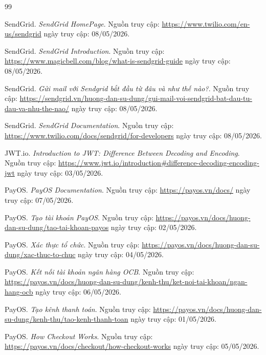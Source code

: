 \begin{thebibliography}{99}

SendGrid. \textit{SendGrid HomePage}. 
Nguồn truy cập: \url{https://www.twilio.com/en-us/sendgrid} ngày truy cập: 08/05/2026.

SendGrid. \textit{SendGrid Introduction}. 
Nguồn truy cập: \url{https://www.magicbell.com/blog/what-is-sendgrid-guide} ngày truy cập: 08/05/2026.

SendGrid. \textit{Gửi mail với Sendgrid bắt đầu từ đâu và như thế nào?}. 
Nguồn truy cập: \url{https://sendgrid.vn/huong-dan-su-dung/gui-mail-voi-sendgrid-bat-dau-tu-dau-va-nhu-the-nao/} ngày truy cập: 08/05/2026.

SendGrid. \textit{SendGrid Documentation}. 
Nguồn truy cập: \url{https://www.twilio.com/docs/sendgrid/for-developers} ngày truy cập: 08/05/2026.

JWT.io. \textit{Introduction to JWT: Difference Between Decoding and Encoding}. 
Nguồn truy cập: \url{https://www.jwt.io/introduction#difference-decoding-encoding-jwt} ngày truy cập: 03/05/2026.

PayOS. \textit{PayOS Documentation}. 
Nguồn truy cập: \url{https://payos.vn/docs/} ngày truy cập: 07/05/2026.

PayOS. \textit{Tạo tài khoản PayOS}. 
Nguồn truy cập: \url{https://payos.vn/docs/huong-dan-su-dung/tao-tai-khoan-payos} ngày truy cập: 02/05/2026.

PayOS. \textit{Xác thực tổ chức}. 
Nguồn truy cập: \url{https://payos.vn/docs/huong-dan-su-dung/xac-thuc-to-chuc} ngày truy cập: 04/05/2026.

PayOS. \textit{Kết nối tài khoản ngân hàng OCB}. 
Nguồn truy cập: \url{https://payos.vn/docs/huong-dan-su-dung/kenh-thu/ket-noi-tai-khoan/ngan-hang-ocb} ngày truy cập: 06/05/2026.

PayOS. \textit{Tạo kênh thanh toán}. 
Nguồn truy cập: \url{https://payos.vn/docs/huong-dan-su-dung/kenh-thu/tao-kenh-thanh-toan} ngày truy cập: 01/05/2026.

PayOS. \textit{How Checkout Works}. 
Nguồn truy cập: \url{https://payos.vn/docs/checkout/how-checkout-works} ngày truy cập: 05/05/2026.


\end{thebibliography}
